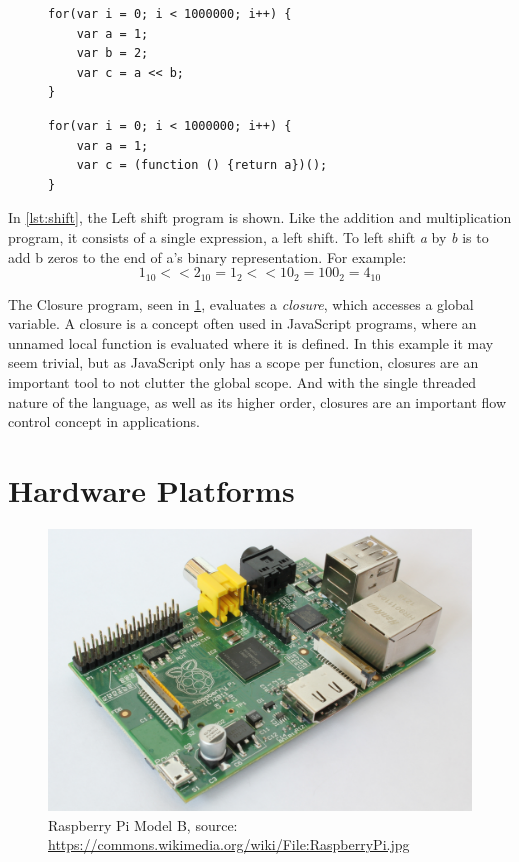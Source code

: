 \begin{figure}[h!]
\begin{minipage}{0.45\textwidth}
\begin{verbatim}
for(var i = 0; i < 1000000; i++) {
    var a = 1;
    var b = 2;
    var c = a << b;
}
\end{verbatim}
\label{lst:shift}
\end{minipage}\hfill
\begin{minipage}{0.45\textwidth}
\begin{verbatim}
for(var i = 0; i < 1000000; i++) {
    var a = 1;
    var c = (function () {return a})();
}
\end{verbatim}
\label{lst:closure}
\end{minipage}
\end{figure}

In \cref{lst:shift}, the Left shift program is shown.
Like the addition and multiplication program, it consists of a single expression, a left shift.
To left shift \emph{a} by \emph{b} is to add b zeros to the end of a's binary representation.
For example:
\[1_{10} << 2_{10} = 1_{2} << 10_{2} = 100_{2} = 4_{10}\]

The Closure program, seen in \cref{lst:closure}, evaluates a \emph{closure}, which accesses a global variable.
A closure is a concept often used in JavaScript programs, where an unnamed local function is evaluated where it is defined.
In this example it may seem trivial, but as JavaScript only has a scope per function, closures are an important tool to not clutter the global scope.
And with the single threaded nature of the language, as well as its higher order, closures are an important flow control concept in applications.




\section{Hardware Platforms}

\begin{figure}[h!]
\centering
\includegraphics[scale=0.08]{fig/pics/RaspberryPi.jpg}
\caption{Raspberry Pi Model B, {\tiny source: \url{https://commons.wikimedia.org/wiki/File:RaspberryPi.jpg}}}
\label{fig:raspberrypi}
\end{figure}

